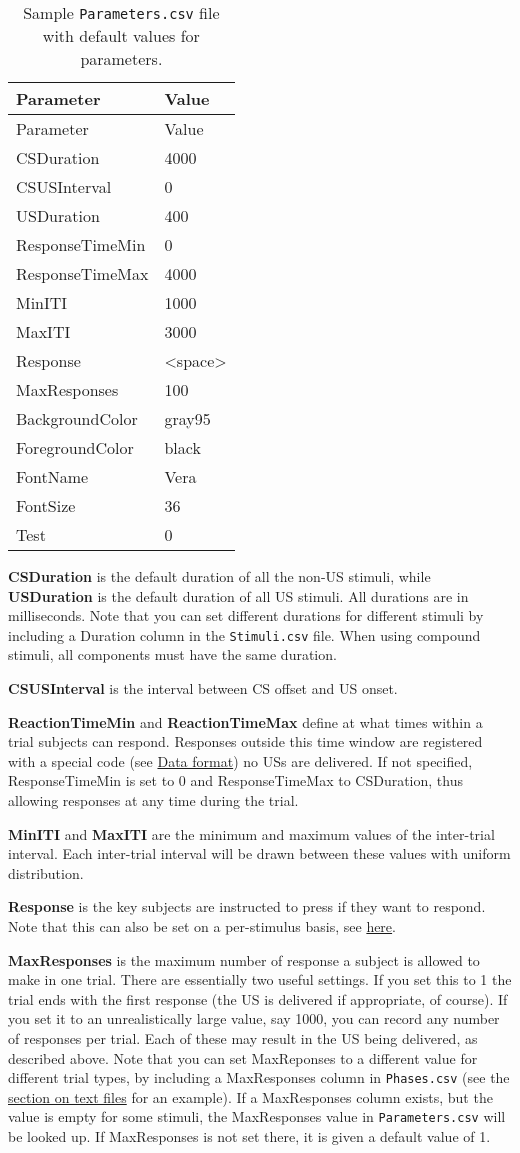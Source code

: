 \documentclass[11pt,]{article}
\begin{document}
\begin{longtable}[c]{@{}ll@{}}
\caption{Sample \texttt{Parameters.csv} file with default values for
parameters.}\tabularnewline
\toprule
Parameter & Value\tabularnewline
\midrule
\endfirsthead
\toprule
Parameter & Value\tabularnewline
\midrule
\endhead
CSDuration & 4000\tabularnewline
CSUSInterval & 0\tabularnewline
USDuration & 400\tabularnewline
ResponseTimeMin & 0\tabularnewline
ResponseTimeMax & 4000\tabularnewline
MinITI & 1000\tabularnewline
MaxITI & 3000\tabularnewline
Response & \textless{}space\textgreater{}\tabularnewline
MaxResponses & 100\tabularnewline
BackgroundColor & gray95\tabularnewline
ForegroundColor & black\tabularnewline
FontName & Vera\tabularnewline
FontSize & 36\tabularnewline
Test & 0\tabularnewline
\bottomrule
\end{longtable}

\textbf{CSDuration} is the default duration of all the non-US stimuli,
while \textbf{USDuration} is the default duration of all US stimuli. All
durations are in milliseconds. Note that you can set different durations
for different stimuli by including a Duration column in the
\texttt{Stimuli.csv} file. When using compound stimuli, all components
must have the same duration.

\textbf{CSUSInterval} is the interval between CS offset and US onset.

\textbf{ReactionTimeMin} and \textbf{ReactionTimeMax} define at what
times within a trial subjects can respond. Responses outside this time
window are registered with a special code (see
\hyperref[data-format]{Data format}) no USs are delivered. If not
specified, ResponseTimeMin is set to 0 and ResponseTimeMax to
CSDuration, thus allowing responses at any time during the trial.

\textbf{MinITI} and \textbf{MaxITI} are the minimum and maximum values
of the inter-trial interval. Each inter-trial interval will be drawn
between these values with uniform distribution.

\textbf{Response} is the key subjects are instructed to press if they
want to respond. Note that this can also be set on a per-stimulus basis,
see \hyperref[responses]{here}.

\label{maxresponses} \textbf{MaxResponses} is the maximum number of
response a subject is allowed to make in one trial. There are
essentially two useful settings. If you set this to 1 the trial ends
with the first response (the US is delivered if appropriate, of course).
If you set it to an unrealistically large value, say 1000, you can
record any number of responses per trial. Each of these may result in
the US being delivered, as described above. Note that you can set
MaxReponses to a different value for different trial types, by including
a MaxResponses column in \texttt{Phases.csv} (see the
\hyperref[textfiles]{section on text files} for an example). If a
MaxResponses column exists, but the value is empty for some stimuli, the
MaxResponses value in \texttt{Parameters.csv} will be looked up. If
MaxResponses is not set there, it is given a default value of 1.
\end{document}
